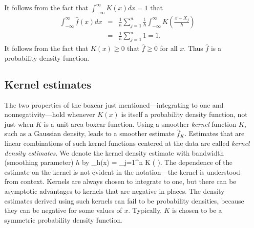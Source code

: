 It follows from the fact that $\int_{-\infty}^\infty K(x) dx = 1$ that
\begin{eqnarray}
    \int_{-\infty}^\infty \hat{f}(x) dx
        &=&
        \frac{1}{n} \sum_{j=1}^n \frac{1}{h} \int_{-\infty}^\infty K
        \left ( \frac{x - X_j}{h} \right )
        \nonumber \\
        &=& \frac{1}{n} \sum_{j=1}^n 1 = 1.
\end{eqnarray}
It follows from the fact that $K(x) \ge 0$ that $\hat{f} \ge 0$ for all $x$.
Thus $\hat{f}$ is a probability density function.

\subsection{Kernel estimates}

The two properties of the boxcar just mentioned---integrating to one and nonnegativity---hold 
whenever $K(x)$ is itself a probability density function, not just when $K$ is a 
unit-area boxcar function.
Using a smoother {\em kernel\/} function $K$, such as a Gaussian density,
leads to a smoother estimate $\hat{f}_K$.
Estimates that are linear combinations of such kernel functions centered at the
data are called {\em kernel density estimates\/}.
We denote the kernel density estimate with bandwidth (smoothing parameter) $h$ by
\beq
    _h(x) =  \sum_{j=1}^n K \left (  \right ).
\eeq
The dependence of the estimate on the kernel is not evident in the notation---the kernel
is understood from context.
Kernels are always chosen to integrate to one, but there can be asymptotic advantages
to kernels that are negative in places.
The density estimates derived using such kernels can fail to be probability densities,
because they can be negative for some values of $x$.
Typically, $K$ is chosen to be a symmetric probability density function.

